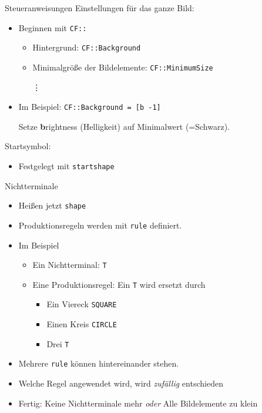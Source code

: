 \documentclass{beamer}
\theoremstyle{example}
\begin{document}
\begin{frame}{Steueranweisungen}
Einstellungen für das ganze Bild:
  \begin{itemize}
  \item Beginnen mit \lstinline!CF::!
    \begin{itemize}
    \item Hintergrund: \lstinline!CF::Background!
    \item Minimalgröße der Bildelemente: \lstinline!CF::MinimumSize!
    \item[\vdots]
    \end{itemize}
   \item Im Beispiel: \lstinline!CF::Background = [b -1]!

     Setze \textbf{b}rightness (Helligkeit) auf Minimalwert (=Schwarz).
  \end{itemize}
Startsymbol: 
\begin{itemize}
\item Festgelegt mit \lstinline!startshape!
\end{itemize}
\end{frame}

\begin{frame}{Nichtterminale}
  \begin{itemize}
  \item Heißen jetzt \lstinline!shape!
  \item Produktionsregeln werden mit \lstinline!rule! definiert.
  \item Im Beispiel
    \begin{itemize}
    \item Ein Nichtterminal: \lstinline!T!
    \item Eine Produktionsregel: Ein \lstinline!T! wird ersetzt durch
      \begin{itemize}
      \item Ein Viereck \lstinline!SQUARE!
      \item Einen Kreis \lstinline!CIRCLE!
      \item Drei \lstinline!T!
      \end{itemize}
    \end{itemize}
  \item Mehrere \lstinline{rule} können hintereinander stehen.
  \item Welche Regel angewendet wird, wird \emph{zufällig} entschieden
  \item Fertig: Keine Nichtterminale mehr \emph{oder} Alle Bildelemente zu klein
  \end{itemize}
\end{frame}
\end{document}
